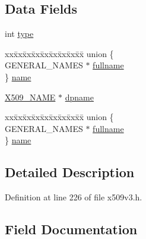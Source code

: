\subsection*{Data Fields}
\begin{DoxyCompactItemize}
\item 
int \hyperlink{struct_d_i_s_t___p_o_i_n_t___n_a_m_e__st_ac765329451135abec74c45e1897abf26}{type}
\item 
\begin{tabbing}
xx\=xx\=xx\=xx\=xx\=xx\=xx\=xx\=xx\=\kill
union \{\\
\>GENERAL\_NAMES $\ast$ \hyperlink{struct_d_i_s_t___p_o_i_n_t___n_a_m_e__st_a2d934df1a61550f9d1257eaecf260c98}{fullname}\\
\} \hyperlink{struct_d_i_s_t___p_o_i_n_t___n_a_m_e__st_a9d8a0bbaedb95f97c096e8d53f1a70a1}{name}\\

\end{tabbing}\item 
\hyperlink{crypto_2ossl__typ_8h_a5c5fc036757e87b9bd163d0221696533}{X509\+\_\+\+N\+A\+ME} $\ast$ \hyperlink{struct_d_i_s_t___p_o_i_n_t___n_a_m_e__st_ab709c6ff208dffff8473bca83b030291}{dpname}
\item 
\begin{tabbing}
xx\=xx\=xx\=xx\=xx\=xx\=xx\=xx\=xx\=\kill
union \{\\
\>GENERAL\_NAMES $\ast$ \hyperlink{struct_d_i_s_t___p_o_i_n_t___n_a_m_e__st_a2d934df1a61550f9d1257eaecf260c98}{fullname}\\
\} \hyperlink{struct_d_i_s_t___p_o_i_n_t___n_a_m_e__st_a274eb3f487586aa165253cab11cad834}{name}\\

\end{tabbing}\end{DoxyCompactItemize}


\subsection{Detailed Description}


Definition at line 226 of file x509v3.\+h.



\subsection{Field Documentation}
